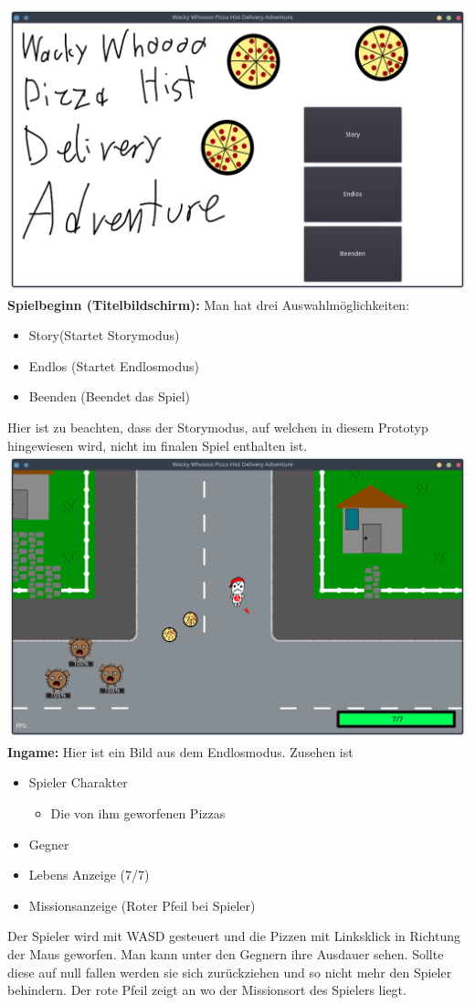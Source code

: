 \documentclass{article}
\begin{document}
	\includegraphics[width=\textwidth]{start.png}
	\textbf{Spielbeginn (Titelbildschirm):}
	Man hat drei Auswahlmöglichkeiten:
	\begin{itemize}
		\item Story(Startet Storymodus)
		\item Endlos (Startet Endlosmodus)
		\item Beenden (Beendet das Spiel)
	\end{itemize}
	Hier ist zu beachten, dass der Storymodus, auf welchen in diesem Prototyp hingewiesen wird, nicht im finalen Spiel enthalten ist.\\
	
	\includegraphics[width=\textwidth]{ingame.png}
	\textbf{Ingame:}
	Hier ist ein Bild aus dem Endlosmodus.
	Zusehen ist
	\begin{itemize}
		\item Spieler Charakter
		\begin{itemize}
			\item Die von ihm geworfenen Pizzas
		\end{itemize}
		\item Gegner
		\item Lebens Anzeige (7/7)
		\item Missionsanzeige (Roter Pfeil bei Spieler)
	\end{itemize}
	Der Spieler wird mit WASD gesteuert und die Pizzen mit Linksklick in Richtung der Maus geworfen.
	Man kann unter den Gegnern ihre Ausdauer sehen. Sollte diese auf null fallen werden sie sich zurückziehen und so nicht mehr den Spieler behindern.
	Der rote Pfeil zeigt an wo der Missionsort des Spielers liegt.
	
\end{document}
